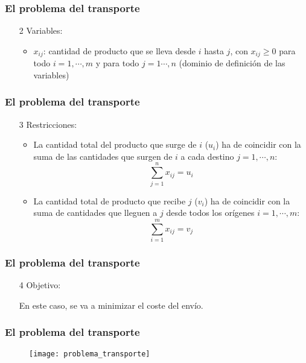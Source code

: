 \documentclass{beamer}
\begin{document}
\begin{frame}
\frametitle{El problema del transporte}
\begin{itemize}
\item[2] Variables:
\begin{itemize}
\item $x_{ij}$: cantidad de producto que se lleva desde $i$ hasta $j$, con $x_{ij}\geq 0$ para todo $i=1,\cdots,m$ y para todo $j=1\cdots, n$ (dominio de definici\'on de las variables)
\end{itemize}
\end{itemize}
\end{frame}


\begin{frame}
\frametitle{El problema del transporte}
\begin{itemize}
\item[3] Restricciones:
\begin{itemize}
\item La cantidad total del producto que surge de $i$ ($u_i$) ha de coincidir con la suma de las cantidades que surgen de $i$ a cada destino $j=1,\cdots, n$:
\[\sum_{j=1}^n x_{ij} = u_i \]
\item La cantidad total de producto que recibe $j$ ($v_i$) ha de coincidir con la suma de cantidades que lleguen a $j$ desde todos los or\'igenes $i=1,\cdots, m$:
\[\sum_{i=1}^m x_{ij} = v_j \]
\end{itemize}
\end{itemize}
\end{frame}

\begin{frame}
\frametitle{El problema del transporte}
\begin{itemize}
\item[4] Objetivo:

En este caso, se va a minimizar el coste del env\'io.
\end{itemize}
\end{frame}


\begin{frame}
\frametitle{El problema del transporte}
\begin{figure}[h]
\label{fig:volumen}
\centering
\texttt{[image: problema\_transporte]}
\end{figure}
\end{frame}
\end{document}
